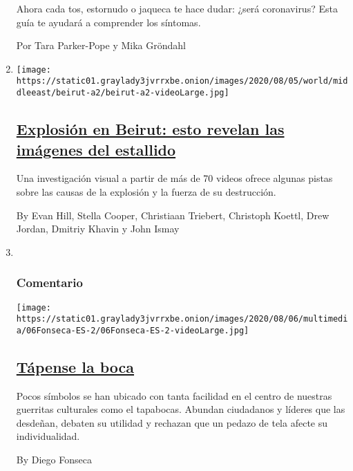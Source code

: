 \begin{enumerate}
  Ahora cada tos, estornudo o jaqueca te hace dudar: ¿será coronavirus?
  Esta guía te ayudará a comprender los síntomas.

  Por Tara Parker-Pope y Mika Gröndahl
\item
  \texttt{[image: https://static01.graylady3jvrrxbe.onion/images/2020/08/05/world/middleeast/beirut-a2/beirut-a2-videoLarge.jpg]}

  \hypertarget{explosiuxf3n-en-beirut-esto-revelan-las-imuxe1genes-del-estallido}{%
  \subsection{\texorpdfstring{\href{/es/2020/08/06/espanol/mundo/beirut-video-explosion-libano.html}{Explosión
  en Beirut: esto revelan las imágenes del
  estallido}}{Explosión en Beirut: esto revelan las imágenes del estallido}}\label{explosiuxf3n-en-beirut-esto-revelan-las-imuxe1genes-del-estallido}}

  Una investigación visual a partir de más de 70 videos ofrece algunas
  pistas sobre las causas de la explosión y la fuerza de su destrucción.

  By Evan Hill, Stella Cooper, Christiaan Triebert, Christoph Koettl,
  Drew Jordan, Dmitriy Khavin y John Ismay
\item ~
  \hypertarget{comentario-1}{%
  \subsubsection{Comentario}\label{comentario-1}}

  \texttt{[image: https://static01.graylady3jvrrxbe.onion/images/2020/08/06/multimedia/06Fonseca-ES-2/06Fonseca-ES-2-videoLarge.jpg]}

  \hypertarget{tuxe1pense-la-boca}{%
  \subsection{\texorpdfstring{\href{/es/2020/08/06/espanol/opinion/cubrebocas-guerra-cultural.html}{Tápense
  la boca}}{Tápense la boca}}\label{tuxe1pense-la-boca}}

  Pocos símbolos se han ubicado con tanta facilidad en el centro de
  nuestras guerritas culturales como el tapabocas. Abundan ciudadanos y
  líderes que las desdeñan, debaten su utilidad y rechazan que un pedazo
  de tela afecte su individualidad.

  By Diego Fonseca
\end{enumerate}


